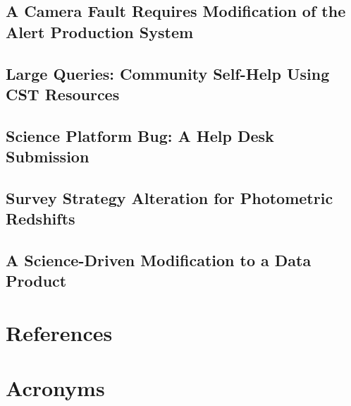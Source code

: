 \documentclass[DM,lsstdraft,authoryear,toc]{lsstdoc}
\begin{document}
\clearpage
\subsection{A Camera Fault Requires Modification of the Alert Production System}


\clearpage
\subsection{Large Queries: Community Self-Help Using CST Resources}


\clearpage
\subsection{Science Platform Bug: A Help Desk Submission}


\clearpage
\subsection{Survey Strategy Alteration for Photometric Redshifts}


\clearpage
\subsection{A Science-Driven Modification to a Data Product}




\appendix
\section{References} \label{sec:bib}
\renewcommand{\refname}{} %


\section{Acronyms} \label{sec:acronyms}

\end{document}
